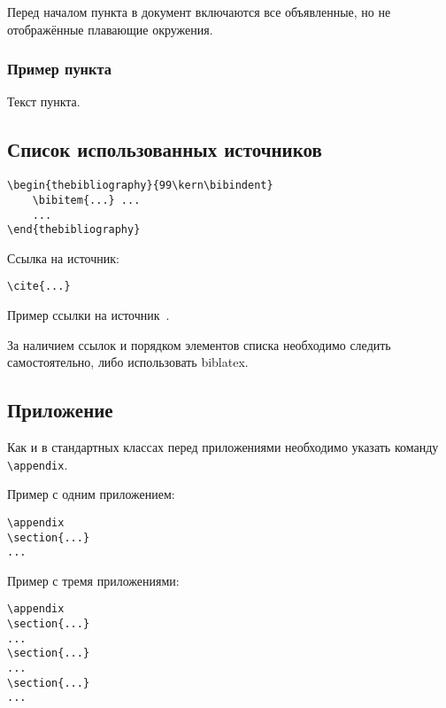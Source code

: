 \documentclass[14pt, a4paper, titlepage]{extarticle}
\renewcommand{\thesection}{\Asbuk{section}}
\let\oldsec\section
\renewcommand{\section}{
        \clearpage
        \phantomsection
        \refstepcounter{section}
        \setcounter{figure}{0} %
        \setcounter{table}{0} %
        \setcounter{equation}{0} %
        \addcontentsline{toc}{section}{\appendixname~\thesection}
        \oldsec*} %
\begin{document}
 Перед началом пункта в документ включаются все объявленные, но не отображённые плавающие окружения.

\subsubsection{Пример пункта}

Текст пункта.

\subsection{Список использованных источников}

\begin{verbatim}
\begin{thebibliography}{99\kern\bibindent}
    \bibitem{...} ...
    ...
\end{thebibliography}
\end{verbatim}

Ссылка на источник:
\begin{verbatim}
\cite{...}
\end{verbatim}

Пример ссылки на источник~\cite{bib:recomendations}.

За наличием ссылок и порядком элементов списка необходимо следить самостоятельно, либо использовать biblatex.


\subsection{Приложение}

Как и в стандартных классах перед приложениями необходимо указать команду \verb"\appendix".

Пример с одним приложением:
\begin{verbatim}
\appendix
\section{...}
...
\end{verbatim}

Пример с тремя приложениями:
\begin{verbatim}
\appendix
\section{...}
...
\section{...}
...
\section{...}
...
\end{verbatim}
\end{document}
